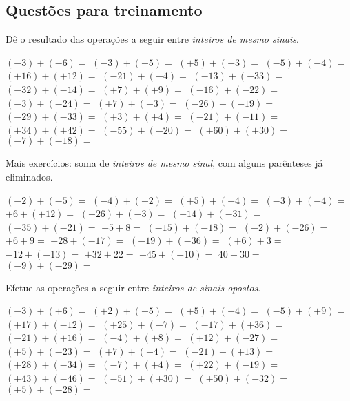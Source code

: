 
\begin{questions}


\section{Questões para treinamento}


	\question Dê o resultado das operações a seguir entre \textit{inteiros de mesmo sinais}.

	\begin{choices}

		\choice $(-3)+(-6)=$
		\choice $(-3)+(-5)=$
		\choice $(+5)+(+3)=$
		\choice $(-5)+(-4)=$
		\choice $(+16)+(+12)=$
		\choice $(-21)+(-4)=$
		\choice $(-13)+(-33)=$
		\choice $(-32)+(-14)=$
		\choice $(+7)+(+9)=$
		\choice $(-16)+(-22)=$
		\choice $(-3)+(-24)=$
		\choice $(+7)+(+3)=$
		\choice $(-26)+(-19)=$
		\choice $(-29)+(-33)=$
		\choice $(+3)+(+4)=$
		\choice $(-21)+(-11)=$
		\choice $(+34)+(+42)=$
		\choice $(-55)+(-20)=$
		\choice $(+60)+(+30)=$
		\choice $(-7)+(-18)=$

	\end{choices}


	\question Mais exercícios: soma de \textit{inteiros de mesmo sinal}, com alguns parênteses já eliminados.

\begin{choices}
	
	\choice $(-2)+(-5)=$
	\choice $(-4)+(-2)=$
	\choice $(+5)+(+4)=$
	\choice $(-3)+(-4)=$
	\choice $+6 +(+12)=$
	\choice $(-26)+(-3)=$
	\choice $(-14)+(-31)=$
	\choice $(-35)+(-21)=$
	\choice $+5+8=$
	\choice $(-15)+(-18)=$
	\choice $(-2)+(-26)=$
	\choice $+6+9=$
	\choice $-28+(-17)=$
	\choice $(-19)+(-36)=$
	\choice $(+6)+3=$
	\choice $-12+(-13)=$
	\choice $+32+22=$
	\choice $-45+(-10)=$
	\choice $40+30=$
	\choice $(-9)+(-29)=$
	
\end{choices}


	\question Efetue as operações a seguir entre \textit{inteiros de sinais opostos}.

\begin{choices}
	
	\choice $(-3)+(+6)=$
	\choice $(+2)+(-5)=$
	\choice $(+5)+(-4)=$
	\choice $(-5)+(+9)=$
	\choice $(+17)+(-12)=$
	\choice $(+25)+(-7)=$
	\choice $(-17)+(+36)=$
	\choice $(-21)+(+16)=$
	\choice $(-4)+(+8)=$
	\choice $(+12)+(-27)=$
	\choice $(+5)+(-23)=$
	\choice $(+7)+(-4)=$
	\choice $(-21)+(+13)=$
	\choice $(+28)+(-34)=$
	\choice $(-7)+(+4)=$
	\choice $(+22)+(-19)=$
	\choice $(+43)+(-46)=$
	\choice $(-51)+(+30)=$
	\choice $(+50)+(-32)=$
	\choice $(+5)+(-28)=$
	

\end{choices}
\end{questions}

